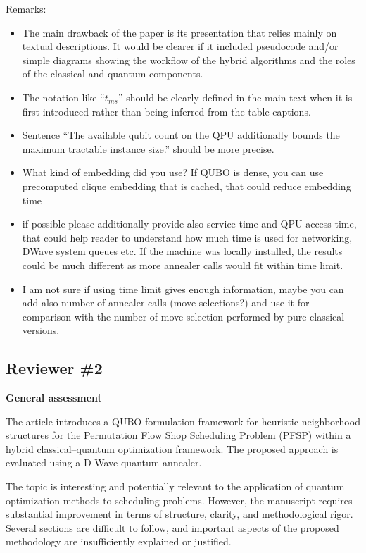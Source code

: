 \documentclass[12pt]{article}
\begin{document}
Remarks:
\begin{itemize}[label=-]
\item The main drawback of the paper is its presentation that relies mainly on textual descriptions. It would be clearer if it included pseudocode and/or simple diagrams showing the workflow of the hybrid algorithms and the roles of the classical and quantum components.
\item The notation like ``$t_{ms}$'' should be clearly defined in the main text when it is first introduced rather than being inferred from the table captions.
\item Sentence ``The available qubit count on the QPU additionally bounds the maximum tractable instance size.'' should be more precise.
\item What kind of embedding did you use? If QUBO is dense, you can use precomputed clique embedding that is cached, that could reduce embedding time
\item if possible please additionally provide also service time and QPU access time, that could help reader to understand how much time is used for networking, DWave system queues etc. If the machine was locally installed, the results could be much different as more annealer calls would fit within time limit.
\item I am not sure if using time limit gives enough information, maybe you can add also number of annealer calls (move selections?) and use it for comparison with the number of move selection performed by pure classical versions.
\end{itemize}

\subsection*{Reviewer \#2}

\textbf{General assessment}

The article introduces a QUBO formulation framework for heuristic neighborhood structures for the Permutation Flow Shop Scheduling Problem (PFSP) within a hybrid classical--quantum optimization framework. The proposed approach is evaluated using a D-Wave quantum annealer.

The topic is interesting and potentially relevant to the application of quantum optimization methods to scheduling problems. However, the manuscript requires substantial improvement in terms of structure, clarity, and methodological rigor. Several sections are difficult to follow, and important aspects of the proposed methodology are insufficiently explained or justified.
\end{document}
